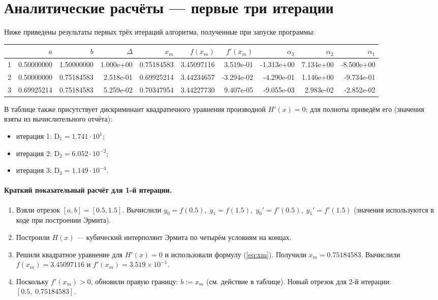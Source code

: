 \documentclass[a4paper,12pt]{article}
\begin{document}
\section*{Аналитические расчёты — первые три итерации}
Ниже приведены результаты первых трёх итераций алгоритма, полученные при запуске программы:

\begin{table}[h]
\centering
{\scriptsize
\setlength{\tabcolsep}{4pt}
\begin{tabular}{r r r r r r r r r r}
\toprule
 & $a$ & $b$ & $\Delta$ & $x_m$ & $f(x_m)$ & $f'(x_m)$ & $\alpha_3$ & $\alpha_2$ & $\alpha_1$ \\
\midrule
1 & 0.50000000 & 1.50000000 & 1.000e+00 & 0.75184583 & 3.45097116 & 3.519e-01 & -1.313e+00 & 7.134e+00 & -8.500e+00 \\
2 & 0.50000000 & 0.75184583 & 2.518e-01 & 0.69925214 & 3.44234657 & -3.294e-02 & -4.290e-01 & 1.146e+00 & -9.734e-01 \\
3 & 0.69925214 & 0.75184583 & 5.259e-02 & 0.70347954 & 3.44227730 & 9.407e-05 & -9.055e-03 & 2.983e-02 & -2.852e-02 \\
\bottomrule
\end{tabular}
}
\label{tab:iters}
\end{table}

В таблице также присутствует дискриминант квадратичного уравнения производной $H'(x)=0$; для полноты приведём его (значения взяты из вычислительного отчёта):
\begin{itemize}
  \item итерация 1: $\mathrm{D_1}=1.741 \cdot 10^{1}$;
  \item итерация 2: $\mathrm{D_2}=6.052 \cdot 10^{-2}$;
  \item итерация 3: $\mathrm{D_3}=1.149 \cdot 10^{-4}$.
\end{itemize}

\paragraph{Краткий показательный расчёт для 1-й итерации.}
\begin{enumerate}
  \item Взяли отрезок $[a,b]=[0.5,1.5]$. Вычислили $y_0=f(0.5),\;y_1=f(1.5),\;y_0'=f'(0.5),\;y_1'=f'(1.5)$ (значения используются в коде при построении Эрмита).
  \item Построили $H(x)$ — кубический интерполянт Эрмита по четырём условиям на концах.
  \item Решили квадратное уравнение для $H'(x)=0$ и использовали формулу (\ref{eq:xm}). Получили $x_m=0.75184583$. Вычислили $f(x_m)=3.45097116$ и $f'(x_m)=3.519\times10^{-1}$.
  \item Поскольку $f'(x_m)>0$, обновили правую границу: $b:=x_m$ (см. действие в таблице). Новый отрезок для 2-й итерации: $[0.5,\;0.75184583]$.
\end{enumerate}
\end{document}
